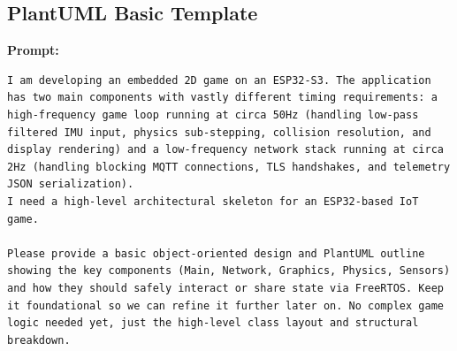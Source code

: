 \subsection*{PlantUML Basic Template}

\textbf{Prompt:}
\begin{lstlisting}[language={}, breaklines=true]
I am developing an embedded 2D game on an ESP32-S3. The application has two main components with vastly different timing requirements: a high-frequency game loop running at circa 50Hz (handling low-pass filtered IMU input, physics sub-stepping, collision resolution, and display rendering) and a low-frequency network stack running at circa 2Hz (handling blocking MQTT connections, TLS handshakes, and telemetry JSON serialization).
I need a high-level architectural skeleton for an ESP32-based IoT game.

Please provide a basic object-oriented design and PlantUML outline showing the key components (Main, Network, Graphics, Physics, Sensors) and how they should safely interact or share state via FreeRTOS. Keep it foundational so we can refine it further later on. No complex game logic needed yet, just the high-level class layout and structural breakdown.
\end{lstlisting}

